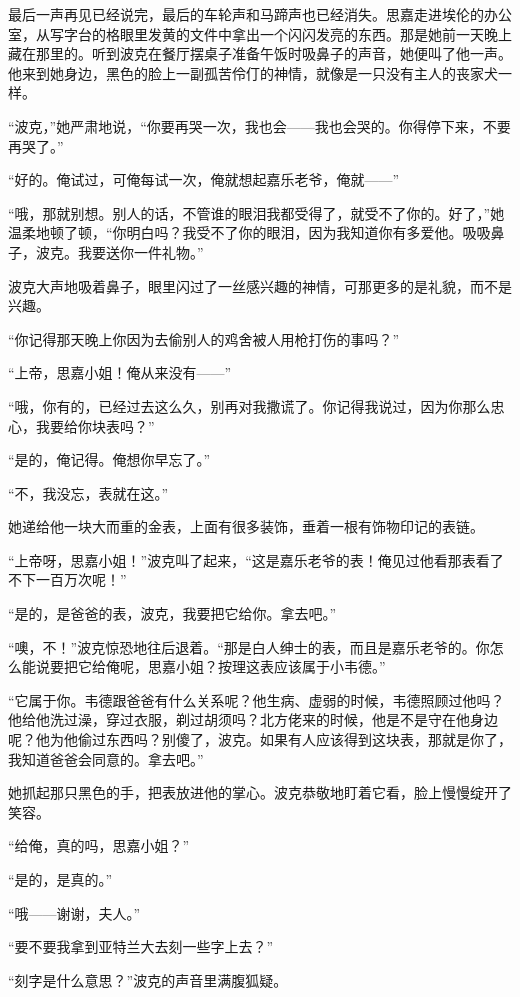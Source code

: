\par 最后一声再见已经说完，最后的车轮声和马蹄声也已经消失。思嘉走进埃伦的办公室，从写字台的格眼里发黄的文件中拿出一个闪闪发亮的东西。那是她前一天晚上藏在那里的。听到波克在餐厅摆桌子准备午饭时吸鼻子的声音，她便叫了他一声。他来到她身边，黑色的脸上一副孤苦伶仃的神情，就像是一只没有主人的丧家犬一样。
\par “波克，”她严肃地说，“你要再哭一次，我也会——我也会哭的。你得停下来，不要再哭了。”
\par “好的。俺试过，可俺每试一次，俺就想起嘉乐老爷，俺就——”
\par “哦，那就别想。别人的话，不管谁的眼泪我都受得了，就受不了你的。好了，”她温柔地顿了顿，“你明白吗？我受不了你的眼泪，因为我知道你有多爱他。吸吸鼻子，波克。我要送你一件礼物。”
\par 波克大声地吸着鼻子，眼里闪过了一丝感兴趣的神情，可那更多的是礼貌，而不是兴趣。
\par “你记得那天晚上你因为去偷别人的鸡舍被人用枪打伤的事吗？”
\par “上帝，思嘉小姐！俺从来没有——”
\par “哦，你有的，已经过去这么久，别再对我撒谎了。你记得我说过，因为你那么忠心，我要给你块表吗？”
\par “是的，俺记得。俺想你早忘了。”
\par “不，我没忘，表就在这。”
\par 她递给他一块大而重的金表，上面有很多装饰，垂着一根有饰物印记的表链。
\par “上帝呀，思嘉小姐！”波克叫了起来，“这是嘉乐老爷的表！俺见过他看那表看了不下一百万次呢！”
\par “是的，是爸爸的表，波克，我要把它给你。拿去吧。”
\par “噢，不！”波克惊恐地往后退着。“那是白人绅士的表，而且是嘉乐老爷的。你怎么能说要把它给俺呢，思嘉小姐？按理这表应该属于小韦德。”
\par “它属于你。韦德跟爸爸有什么关系呢？他生病、虚弱的时候，韦德照顾过他吗？他给他洗过澡，穿过衣服，剃过胡须吗？北方佬来的时候，他是不是守在他身边呢？他为他偷过东西吗？别傻了，波克。如果有人应该得到这块表，那就是你了，我知道爸爸会同意的。拿去吧。”
\par 她抓起那只黑色的手，把表放进他的掌心。波克恭敬地盯着它看，脸上慢慢绽开了笑容。
\par “给俺，真的吗，思嘉小姐？”
\par “是的，是真的。”
\par “哦——谢谢，夫人。”
\par “要不要我拿到亚特兰大去刻一些字上去？”
\par “刻字是什么意思？”波克的声音里满腹狐疑。
